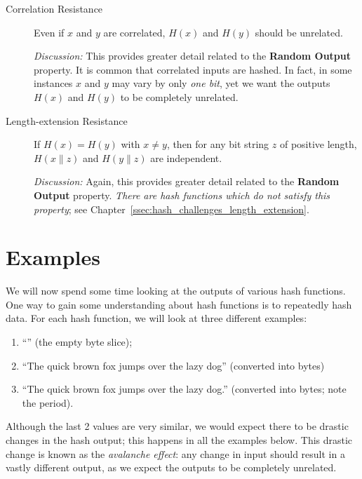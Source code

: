 \begin{description}
\item [Correlation Resistance]
    Even if $x$ and $y$ are correlated, $H(x)$ and $H(y)$
        should be unrelated.

    \emph{Discussion:} This provides greater detail related to
        the \textbf{Random Output} property.
        It is common that correlated inputs are hashed.
        In fact, in some instances $x$ and $y$ may vary by only \emph{one bit},
        yet we want the outputs $H(x)$ and $H(y)$ to be completely
        unrelated.
 \item [Length-extension Resistance]
    If $H(x) = H(y)$ with $x\ne y$, then for any bit string $z$
    of positive length, $H(x\|z)$ and $H(y\|z)$ are independent.

    \emph{Discussion:} Again, this provides greater detail related to
        the \textbf{Random Output} property.
    \emph{There are \glspl{hash function} which do not satisfy this property};
        see Chapter~\ref{ssec:hash_challenges_length_extension}.
\end{description}



\section{Examples}
\label{sec:hash_examples}

We will now spend some time looking at the outputs of various
\glspl{hash function}.
One way to gain some understanding about \glspl{hash function}
is to repeatedly hash data.
For each \gls{hash function}, we will look at three different examples:

\begin{enumerate}
\item ``'' (the empty byte slice);
\item ``The quick brown fox jumps over the lazy dog''
    (converted into bytes)
\item ``The quick brown fox jumps over the lazy dog.''
    (converted into bytes; note the period).
\end{enumerate}

\noindent
Although the last 2 values are very similar,
we would expect there to be drastic changes in the hash output;
this happens in all the examples below.
This drastic change is known as the \emph{avalanche effect}:
any change in input should result in a vastly different output,
as we expect the outputs to be completely unrelated.

